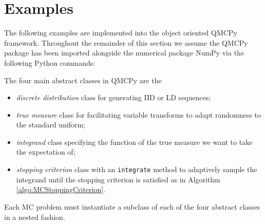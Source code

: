\documentclass[graybox]{svmult}
\begin{document}
\section{Examples} \label{sec:examples}

The following examples are implemented into the object oriented QMCPy framework. Throughout the remainder of this section we assume the QMCPy package \cite{QMCPy} has been imported alongside the numerical package NumPy \cite{numpy} via the following Python commands:

The four main abstract classes in QMCPy are the 
\begin{itemize}
    \item \emph{discrete distribution} class for generating IID or LD sequences;
    \item \emph{true measure} class for facilitating variable transforms to adapt randomness to the standard uniform;
    \item \emph{integrand} class specifying the function of the true measure we want to take the expectation of; 
    \item \emph{stopping criterion} class with an \texttt{integrate} method to adaptively sample the integrand until the stopping criterion is satisfied as in Algorithm \ref{algo:MCStoppingCriterion}.
\end{itemize}
Each MC problem must instantiate a subclass of each of the four abstract classes in a nested fashion. 
\end{document}
